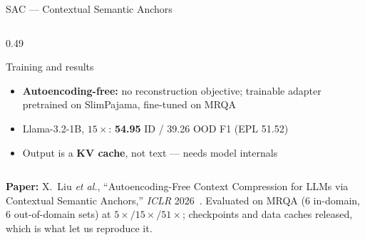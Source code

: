 \documentclass[aspectratio=169,10pt]{beamer}
\begin{document}
\begin{frame}{SAC --- Contextual Semantic Anchors}
\begin{columns}[T]
\begin{column}{0.49\textwidth}
\begin{block}{Training and results}
\scriptsize
\begin{itemize}
  \item \textbf{Autoencoding-free:} no reconstruction objective; trainable
        adapter pretrained on SlimPajama, fine-tuned on MRQA
  \item Llama-3.2-1B, $15\times$: \textbf{54.95} ID / 39.26 OOD F1
        (EPL 51.52)
  \item Output is a \textbf{KV cache}, not text --- needs model internals
\end{itemize}
\end{block}
\end{column}
\end{columns}

\vspace{0.12cm}
{\scriptsize
\textbf{Paper:} X.~Liu \emph{et al.}, ``Autoencoding-Free Context Compression
for LLMs via Contextual Semantic Anchors,'' \emph{ICLR} 2026~\cite{SAC}.
Evaluated on MRQA (6 in-domain, 6 out-of-domain sets) at $5\times/15\times/51\times$;
checkpoints and data caches released, which is what let us reproduce it.}
\end{frame}

\end{document}
